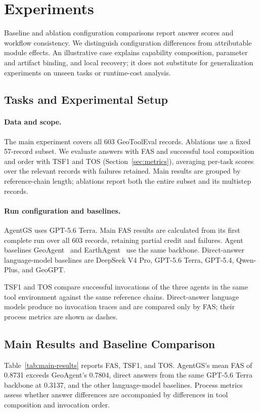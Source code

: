 \section{Experiments}
\label{sec:experiments}
Baseline and ablation configuration comparisons report answer scores and workflow consistency. We distinguish configuration differences from attributable module effects. An illustrative case explains capability composition, parameter and artifact binding, and local recovery; it does not substitute for generalization experiments on unseen tasks or runtime-cost analysis.

\subsection{Tasks and Experimental Setup}
\label{sec:experimental-setup}
\paragraph{Data and scope.}
The main experiment covers all 603 GeoToolEval records. Ablations use a fixed 57-record subset. We evaluate answers with FAS and successful tool composition and order with TSF1 and TOS (Section~\ref{sec:metrics}), averaging per-task scores over the relevant records with failures retained. Main results are grouped by reference-chain length; ablations report both the entire subset and its multistep records.

\paragraph{Run configuration and baselines.}
AgentGS uses GPT-5.6 Terra. Main FAS results are calculated from its first complete run over all 603 records, retaining partial credit and failures. Agent baselines GeoAgent~\cite{chen2024geoagent} and EarthAgent~\cite{feng2026earthagent} use the same backbone. Direct-answer language-model baselines are DeepSeek V4 Pro, GPT-5.6 Terra, GPT-5.4, Qwen-Plus, and GeoGPT.

TSF1 and TOS compare successful invocations of the three agents in the same tool environment against the same reference chains. Direct-answer language models produce no invocation traces and are compared only by FAS; their process metrics are shown as dashes.

\subsection{Main Results and Baseline Comparison}
\label{sec:main-results}
Table~\ref{tab:main-results} reports FAS, TSF1, and TOS. AgentGS's mean FAS of 0.8731 exceeds GeoAgent's 0.7804, direct answers from the same GPT-5.6 Terra backbone at 0.3137, and the other language-model baselines. Process metrics assess whether answer differences are accompanied by differences in tool composition and invocation order.


